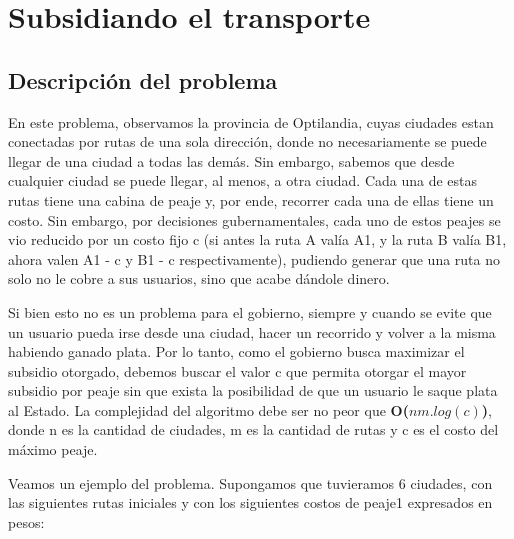 \section{Subsidiando el transporte}

\subsection{Descripción del problema}
En este problema, observamos la provincia de Optilandia, cuyas ciudades estan conectadas por rutas de una sola dirección, donde no necesariamente se puede llegar de una ciudad a todas las demás. Sin embargo, sabemos que desde cualquier ciudad se puede llegar, al menos, a otra ciudad. Cada una de estas rutas tiene una cabina de peaje y, por ende, recorrer cada una de ellas tiene un costo. Sin embargo, por decisiones gubernamentales, cada uno de estos peajes se vio reducido por un costo fijo c (si antes la ruta A valía A1, y la ruta B valía B1, ahora valen A1 - c y B1 - c respectivamente), pudiendo generar que una ruta no solo no le cobre a sus usuarios, sino que acabe dándole dinero.

Si bien esto no es un problema para el gobierno, siempre y cuando se evite que un usuario pueda irse desde una ciudad, hacer un recorrido y volver a la misma habiendo ganado plata. Por lo tanto, como el gobierno busca maximizar el subsidio otorgado, debemos buscar el valor c que permita otorgar el mayor subsidio por peaje sin que exista la posibilidad de que un usuario le saque plata al Estado. La complejidad del algoritmo debe ser no peor que \textbf{O($nm.log(c)$)}, donde n es la cantidad de ciudades, m es la cantidad de rutas y c es el costo del máximo peaje.

Veamos un ejemplo del problema. Supongamos que tuvieramos 6 ciudades, con las siguientes rutas iniciales y con los siguientes costos de peaje1 expresados en pesos:

\bigskip

